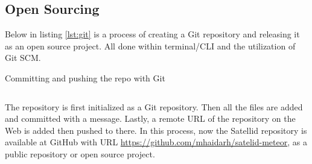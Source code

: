 \subsection{Open Sourcing}

Below in listing \autoref{lst:git} is a process of creating a Git repository and releasing it as an open source project.
All done within terminal/\ac{CLI} and the utilization of Git \ac{SCM}.

\begin{listing}[!h]
\caption{Committing and pushing the repo with Git}
\inputminted{shell-session}{\dir/include/git.shell-session}
\label{lst:git}
\end{listing}

The repository is first initialized as a Git repository.
Then all the files are added and committed with a message.
Lastly, a remote \ac{URL} of the repository on the Web is added then pushed to there.
In this process, now the Satellid repository is available at GitHub with \ac{URL} \url{https://github.com/mhaidarh/satelid-meteor}, as a public repository or open source project.
